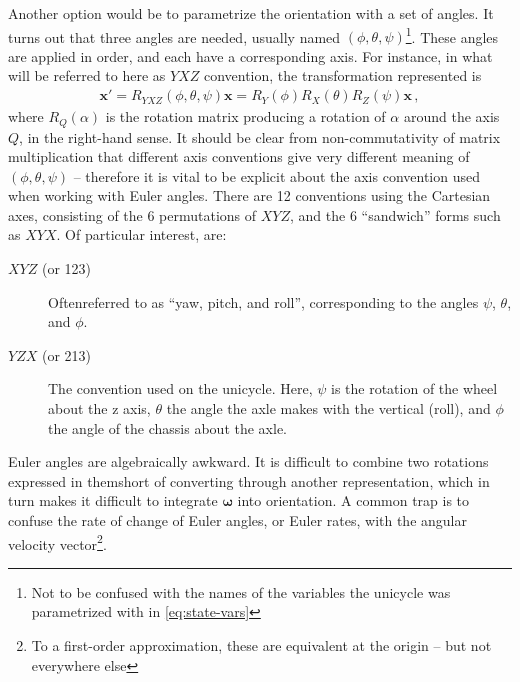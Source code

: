 \documentclass[main.tex]{subfiles}
\begin{document}
	Another option would be to parametrize the orientation with a set of angles.
	It turns out that three angles are needed, usually named $(\phi, \theta, \psi)$\footnote{Not to be confused with the names of the variables the unicycle was parametrized with in \cref{eq:state-vars}}.
	These angles are applied in order, and each have a corresponding axis. For instance, in what will be referred to here as $YXZ$ convention\footnotemark, the transformation represented is
	\begin{align}
		\bm{x}' = R_{YXZ}(\phi, \theta, \psi)\bm{x} = R_Y(\phi)R_X(\theta)R_Z(\psi) \bm{x}\,,
		\label{eq:euler-matrix}
	\end{align}
	where $R_Q(\alpha)$ is the rotation matrix producing a rotation of $\alpha$ around the axis $Q$, in the right-hand sense.
	It should be clear from non-commutativity of matrix multiplication that different axis conventions give very different meaning of $(\phi, \theta, \psi)$ -- therefore it is vital to be explicit about the axis convention used when working with Euler angles.
	There are 12 conventions using the Cartesian axes, consisting of the 6 permutations of $XYZ$, and the 6 \enquote{sandwich} forms such as $XYX$. Of particular interest, are:
	\begin{description}
		\item[$XYZ$ (or 123)]
			Often\footnotemark referred to as \enquote{yaw, pitch, and roll}, corresponding to the angles $\psi$, $\theta$, and $\phi$.
		\item[$YZX$ (or 213)]
			The convention used on the unicycle. Here, $\psi$ is the rotation of the wheel about the z axis, $\theta$ the angle the axle makes with the vertical (roll), and $\phi$ the angle of the chassis about the axle.
	\end{description}
	Euler angles are algebraically awkward. It is difficult to combine two rotations expressed in them\footnotemark short of converting through another representation, which in turn makes it difficult to integrate $\bm{\omega}$ into orientation.
	A common trap is to confuse the rate of change of Euler angles, or Euler rates, with the angular velocity vector\footnote{To a first-order approximation, these are equivalent at the origin -- but not everywhere else}.
\end{document}
